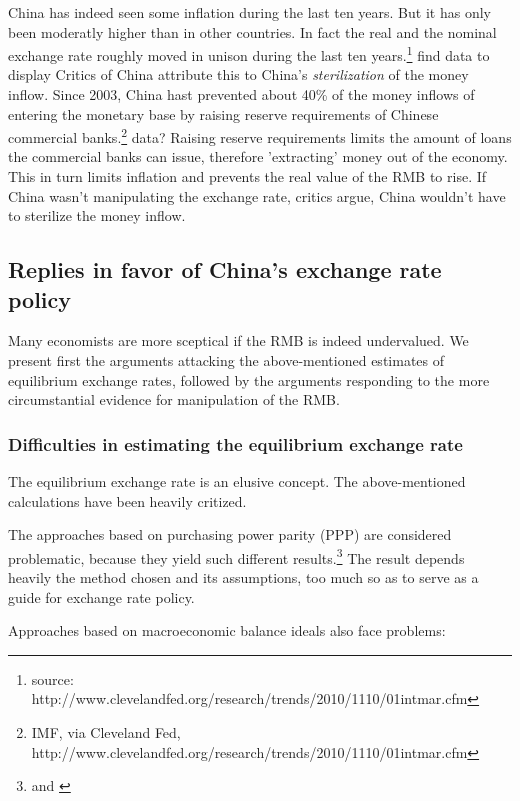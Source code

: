 
China has indeed seen some inflation during the last ten years. But it 
has only been moderatly higher than in other countries. In fact the real 
and the nominal exchange rate roughly moved in unison during the last 
ten years.\footnote{source: 
http://www.clevelandfed.org/research/trends/2010/1110/01intmar.cfm}%
find data to display
Critics of China attribute this to China's \emph{sterilization} of the 
money inflow. Since 2003, China hast prevented about 40\% of the money 
inflows of entering the monetary base by raising reserve requirements of 
Chinese commercial banks.\footnote{IMF, via Cleveland Fed, 
http://www.clevelandfed.org/research/trends/2010/1110/01intmar.cfm}%
data?
Raising reserve requirements limits the amount of loans the commercial 
banks can issue, therefore 'extracting' money out of the economy. This 
in turn limits inflation and prevents the real value of the RMB to rise.  
If China wasn't manipulating the exchange rate, critics argue, China 
wouldn't have to sterilize the money inflow.



\subsection{Replies in favor of China's exchange rate policy}

Many economists are more sceptical if the RMB is indeed undervalued. We present first the arguments attacking the above-mentioned estimates of equilibrium exchange rates, followed by the arguments responding to the more circumstantial evidence for manipulation of the RMB.

\subsubsection{Difficulties in estimating the equilibrium exchange rate}

The equilibrium exchange rate is an elusive concept. The above-mentioned calculations have been heavily critized.

The approaches based on purchasing power parity (PPP) are considered problematic, because they yield such different results.\footnote{\cite[p. 16]{Yu2010} and \cite[pp. 82]{CheungChinn2010}} The result depends heavily the method chosen and its assumptions, too much so as to serve as a guide for exchange rate policy.

Approaches based on macroeconomic balance ideals also face problems: 



